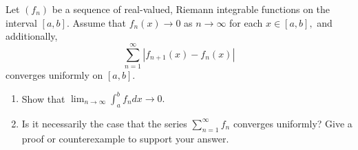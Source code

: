 \documentclass[12pt,letterpaper,boxed]{hmcpset}
\begin{document}
\begin{solution}

\end{solution}

\begin{problem}[Exercise 3.3]
Let $(f_n)$ be a sequence of real-valued, Riemann integrable functions on the interval $[a,b]$. Assume that $f_{n}(x)\rightarrow 0$ as $n\rightarrow\infty$ for each $x\in[a,b],$ and additionally, $$\sum_{n=1}^{\infty}|f_{n + 1}(x) - f_{n}(x)|$$ converges uniformly on $[a,b]$.
\begin{enumerate}
    \item Show that $\lim_{n \rightarrow\infty}\int_{a}^{b}f_n dx \rightarrow 0.$
    \item Is it necessarily the case that the series $\sum_{n=1}^{\infty}f_n$ converges uniformly? Give a proof or counterexample to support your answer.
\end{enumerate}
\end{problem}

\begin{solution}
\end{solution}
\end{document}
